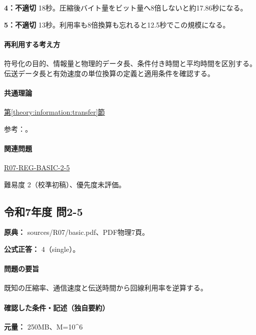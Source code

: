 \noindent\textbf{4：不適切} 18秒。圧縮後バイト量をビット量へ8倍しないと約17.86秒になる。\par

\noindent\textbf{5：不適切} 13秒。利用率も8倍換算も忘れると12.5秒でこの規模になる。\par

\paragraph{再利用する考え方} 符号化の目的、情報量と物理的データ長、条件付き時間と平均時間を区別する。伝送データ長と有効速度の単位換算の定義と適用条件を確認する。

\paragraph{共通理論} \hyperref[theory:information:transfer]{第\ref*{theory:information:transfer}節}

\par 参考：\cite{info_deflate}。

\paragraph{関連問題} \hyperref[q:r07-reg-basic-2-5]{R07-REG-BASIC-2-5}

\par 難易度 2（校準初稿）、優先度未評価。

\subsection{令和7年度 問2-5}
\label{q:r07-reg-basic-2-5}

\noindent\textbf{原典：} sources/R07/basic.pdf、PDF物理7頁。

\textbf{公式正答：} 4（single）。

\paragraph{問題の要旨} 既知の圧縮率、通信速度と伝送時間から回線利用率を逆算する。

\paragraph{確認した条件・記述（独自要約）}\mbox{}\par

\noindent\textbf{元量：} 250MB、M=\allowbreak{}10\textasciicircum{}6\par

